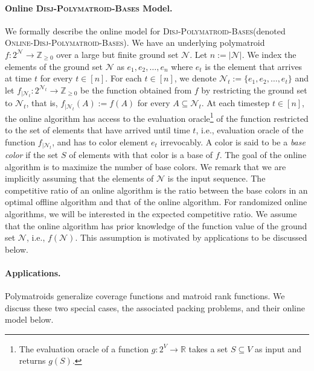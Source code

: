 \documentclass[11pt]{article}
\theoremstyle{definition}
\newcommand{\calN}{{\mathcal{N}}}
\newcommand{\DPB}{\textsc{Disj-Polymatroid-Bases}\xspace}
\newcommand{\ODPB}{\textsc{Online-Disj-Polymatroid-Bases}\xspace}
\begin{document}
\paragraph{Online \DPB Model.} 
We formally describe the online model for \DPB (denoted \ODPB).   
We have an underlying polymatroid $f: 2^{\mathcal{N}}\rightarrow \mathbb{Z}_{\geq 0}$ over a large but finite ground set $\calN$. Let $n:=|\calN|$. 
We index the elements of the ground set $\mathcal{N}$ as $e_1, e_2, \ldots, e_n$ where $e_t$ is the element that arrives at time $t$ for every $t\in [n]$. For each $t\in [n]$, we denote $\mathcal{N}_t:=\{e_1, e_2, \ldots, e_t\}$ and let $f_{|\calN_t}:2^{\calN_t}\rightarrow \mathbb{Z}_{\geq 0}$ be the function obtained from $f$ by restricting the ground set to $\calN_t$, that is, $f_{|\calN_t}(A):=f(A)$ for every $A\subseteq \calN_t$. At each timestep $t\in [n]$, the online algorithm has access to the evaluation oracle\footnote{The evaluation oracle of a function $g: 2^V\rightarrow \mathbb{R}$ takes a set $S\subseteq V$ as input and returns $g(S)$.} of the function restricted to the set of elements that have arrived until time $t$, i.e., evaluation oracle of the function $f_{|\calN_t}$, and has to color element $e_t$ irrevocably.  
A color is said to be a \emph{base color} if the set $S$ of elements with that color is a base of $f$. 
The goal of the online algorithm is to maximize the number of base colors. 
We remark that we are implicitly assuming that the elements of $\calN$ is the input sequence. 
The competitive ratio of an online algorithm is the ratio between the base colors
in an optimal offline algorithm and that of the online algorithm. For randomized online algorithms, we will be interested in the expected competitive ratio. 
We assume that the online algorithm has prior knowledge of the function value of the  ground set $\calN$, i.e., $f(\calN)$. This assumption is motivated by applications to be discussed below. 



\paragraph{Applications.} 
Polymatroids generalize coverage functions and matroid rank functions. We discuss these two special cases, the associated packing problems, and their online model below. 
\end{document}
